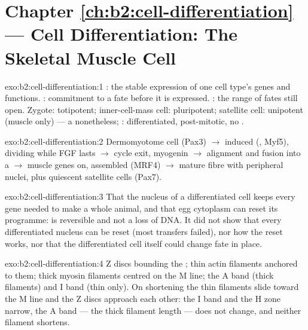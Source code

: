 \section*{Chapter \ref{ch:b2:cell-differentiation} --- Cell Differentiation: The Skeletal Muscle Cell}

\begin{solution}{exo:b2:cell-differentiation:1}
: the stable expression of one cell type's genes and
functions. : commitment to a fate before it is
expressed. : the range of fates still open. Zygote:
totipotent; inner-cell-mass cell: pluripotent; satellite cell:
unipotent (muscle only) --- a  nonetheless; :
differentiated, post-mitotic, no .
\end{solution}

\begin{solution}{exo:b2:cell-differentiation:2}
Dermomyotome cell (Pax3) $\to$ induced  (, Myf5),
dividing while FGF lasts $\to$ cycle exit, myogenin $\to$ alignment
and fusion into a  $\to$ muscle genes on, 
assembled (MRF4) $\to$ mature fibre with peripheral nuclei, plus
quiescent satellite cells (Pax7).
\end{solution}

\begin{solution}{exo:b2:cell-differentiation:3}
That the nucleus of a differentiated cell keeps every gene needed
to make a whole animal, and that egg cytoplasm can reset its
programme:  is reversible and not a loss of DNA. It
did not show that every differentiated nucleus can be reset (most
transfers failed), nor how the reset works, nor that the
differentiated cell itself could change fate in place.
\end{solution}

\begin{solution}{exo:b2:cell-differentiation:4}
Z discs bounding the ; thin actin filaments anchored to
them; thick myosin filaments centred on the M line; the A band
(thick filaments) and I band (thin only). On shortening the thin
filaments slide toward the M line and the Z discs approach each
other: the I band and the H zone narrow, the A band --- the thick
filament length --- does not change, and neither filament shortens.
\end{solution}

